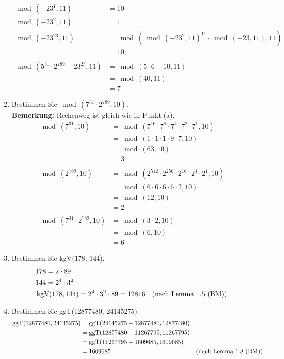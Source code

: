 \begin{enumerate}[label=(\alph*)]
\begin{align*}
			\\\\
			\bmod(-23^{1},11) &=10\\
			\bmod(-23^2,11)&= 1 \\
			\bmod(-23^{23},11) &= \bmod(\bmod(-23^2,11)^{11} \cdot \bmod(-23,11),11) \\ 
			&= 10;
			\\\\
			\bmod(5^{31} \cdot 2^{789}-23^{23}, 11) &= \bmod(5 \cdot 6 +10,11)
			\\&= \bmod(40,11)
			\\&= 7 
		\end{align*}

		\item  Bestimmen Sie $ \bmod(7^{31} \cdot 2^{789}, 10) $. \\
		\textbf{Bemerkung:} Rechenweg ist gleich wie in Punkt (a).
		\begin{align*}
			\bmod(7^{31},10) &= \bmod(7^{16}\cdot7^{8}\cdot7^{4}\cdot7^{2}\cdot7^{1},10)
			\\&= \bmod(1\cdot1\cdot1\cdot9\cdot7,10)
			\\&= \bmod(63,10)
			\\&= 3 \\\\
			\bmod(2^{789},10) &= \bmod(2^{512}\cdot2^{256}\cdot2^{16}\cdot2^4\cdot2^1,10)
			\\&= \bmod(6\cdot 6\cdot 6\cdot 6\cdot 2, 10)
			\\&= \bmod(12,10)
			\\&= 2 \\\\
			\bmod(7^{31} \cdot 2^{789}, 10) &= \bmod(3 \cdot 2,10)
			\\&= \bmod(6,10)
			\\&= 6 
		\end{align*}

		\item Bestimmen Sie kgV(178, 144).
		\begin{align*}
			& 178 = 2\cdot89 \\
			& 144 = 2^4\cdot3^2 \\
			&\operatorname{kgV}(178, 144) = 2^4\cdot3^2\cdot89 = 12816
		 	&\textrm{(nach Lemma 1.5 (BM))}
		\end{align*}

		\item Bestimmen Sie ggT(12877480, 24145275).
		\begin{align*}
			\operatorname{ggT}(12877480, 24145275) &= \operatorname{ggT}(24145275-12877480, 12877480)
			\\& = \operatorname{ggT}(12877480-11267795,11267795)
			\\& = \operatorname{ggT}(11267795-1609685,1609685)
			\\& = 1609685
		 	&\textrm{(nach Lemma 1.8 (BM))}
		\end{align*}


\end{enumerate}
